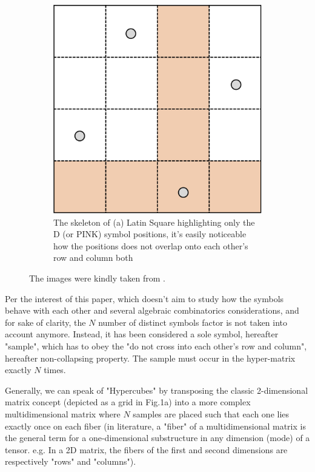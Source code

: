 \documentclass{article}
\begin{document}
\begin{figure}[h]
\begin{subfigure}[b]{0.45\textwidth}
{        	\includegraphics[width=\textwidth]{src/imgs/latin_square_skeleton.png}
        	\caption{The skeleton of (a) Latin Square highlighting only the D (or PINK) symbol positions, it's easily noticeable how the positions does not overlap onto each other's row and column both}
        	\label{fig:latin_square_b}
        }
    \end{subfigure}
    \caption{The images were kindly taken from .}
    \label{fig:latin_square}
\end{figure}

Per the interest of this paper, which doesn't aim to study how the symbols behave with each other and several algebraic combinatorics considerations, and for sake of clarity, the $N$ number of distinct symbols factor is not taken into account anymore. Instead, it has been considered a sole symbol, hereafter "sample", which has to obey the "do not cross into each other's row and column", hereafter non-collapsing property. The sample must occur in the hyper-matrix exactly $N$ times.

Generally, we can speak of "Hypercubes" by transposing the classic 2-dimensional matrix concept (depicted as a grid in Fig.1a) into a more complex multidimensional matrix where $N$ samples are placed such that each one lies exactly once on each fiber (in literature, a "fiber" of a multidimensional matrix is the general term for a one-dimensional substructure in any dimension (mode) of a tensor. e.g. In a 2D matrix, the fibers of the first and second dimensions are respectively "rows" and "columns").
\end{document}
